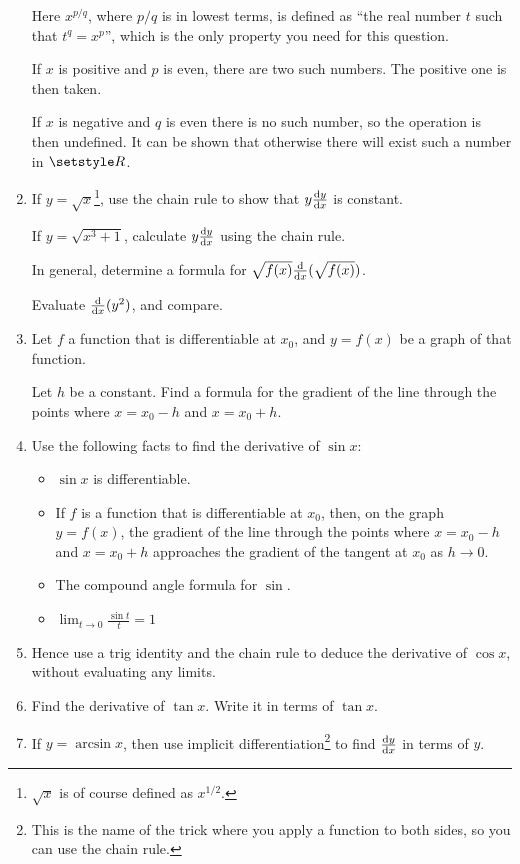 \begin{enumerate}
  Here \(x^{p/q}\), where \(p/q\) is in lowest terms, is defined as ``the real
  number \(t\) such that \(t^q = x^p\)'', which is the only property you need
  for this question.

  If \(x\) is positive and \(p\) is even, there are two such numbers. The
  positive one is then taken.

  If \(x\) is negative and \(q\) is even there is no such number, so the
  operation is then undefined. It can be shown that otherwise there will exist
  such a number in \(\Reals\).
 \item
  If \(y = \sqrt x\)\footnote{
   \(\sqrt x\) is of course defined as \(x^{1/2}\).
  }, use the chain rule to show that \(y \dv<y>{x}\) is
  constant.

  If \(y = \sqrt{x^3 + 1}\), calculate \(y \dv<y>{x}\) using the chain rule.

  In general, determine a formula for \(\sqrt{f(x)}\dv{x}(\sqrt{f(x)})\).

  Evaluate \(\dv{x}(y^2)\), and compare.
 \item
  Let \(f\) a function that is differentiable at \(x_0\), and \(y = f(x)\) be a
  graph of that function.

  Let \(h\) be a constant. Find a formula for the gradient of the line through
  the points where \(x = x_0 - h\) and \(x = x_0 + h\).
 \item
  Use the following facts to find the derivative of \(\sin x\):
  \begin{itemize}
   \item
    \(\sin x\) is differentiable.
   \item
    If \(f\) is a function that is differentiable at \(x_0\), then, on the graph
    \(y = f(x)\), the gradient of the line through the points where
    \(x = x_0 - h\) and \(x = x_0 + h\) approaches the gradient of the tangent
    at \(x_0\) as \(h \to 0\).
   \item
    The compound angle formula for \(\sin\).
   \item
    \(\displaystyle
     \lim_{t \to 0} \frac{\sin t} t = 1
     \)
  \end{itemize}
 \item
  Hence use a trig identity and the chain rule to deduce the derivative of
  \(\cos x\), without evaluating any limits.
 \item
  Find the derivative of \(\tan x\). Write it in terms of \(\tan x\).
 \item \label{q_calc_arcsin}
  If \(y = \arcsin x\), then use implicit differentiation\footnote{
   This is the name of the trick where you apply a function to both sides, so
   you can use the chain rule.
  } to find
  \(\dv<y>{x}\) in terms of \(y\).


\end{enumerate}
